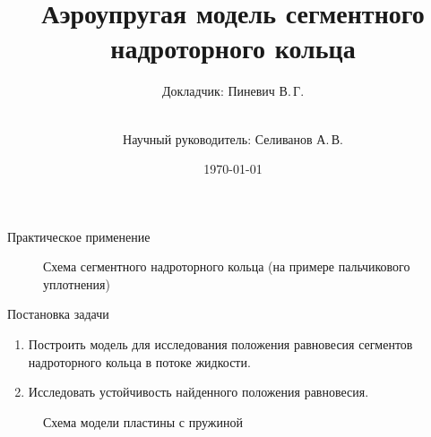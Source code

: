 \documentclass[ignoreonframetext,unicode]{beamer}
\title[Аэроупргугая модель]{Аэроупругая модель сегментного надроторного кольца}
\author[Пиневич В.\,Г.]{Докладчик: Пиневич В.\,Г.\and\\[0.5mm] Научный руководитель: Селиванов А.\,В.}
\institute[каф. Прикладная математика ФН-2]{группа ФН2-81Б}
\date{\today}
\begin{document}
	
	\begin{frame}[plain]
		\maketitle
	\end{frame}


	\begin{frame}{Практическое применение}
		\vspace*{-10mm}
		\begin{figure}[!htbp]
			\caption{Схема сегментного надроторного кольца (на примере пальчикового уплотнения)}
			\label{vved-2}
		\end{figure}
	\end{frame}

	\begin{frame}{Постановка задачи}
		\vspace*{2mm}
	\begin{enumerate}	
	\item Построить модель для исследования положения равновесия сегментов надроторного кольца в потоке жидкости.
	\item Исследовать устойчивость найденного положения равновесия.
\end{enumerate}
		
		\vspace*{-10mm}
	\begin{figure}[!htbp]
		\caption{Схема модели пластины с пружиной}
		\label{pruzina}
	\end{figure}	
		
	
		
	\end{frame}
\end{document}
